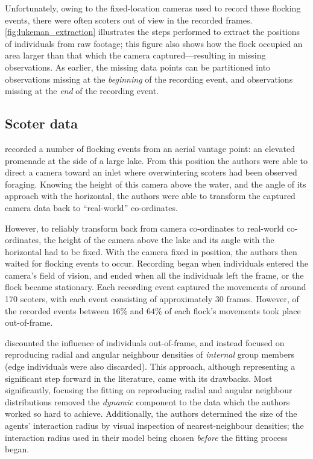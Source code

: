 Unfortunately, owing to the fixed-location cameras used to record these
flocking events, there were often scoters out of view in the recorded frames.
\cref{fig:lukeman_extraction} illustrates the steps performed to extract the
positions of individuals from raw footage; this figure also shows how the flock
occupied an area larger than that which the camera captured---resulting in
missing observations. As earlier, the missing data points can be partitioned
into observations missing at the \emph{beginning} of the recording event, and
observations missing at the \emph{end} of the recording event.

\subsection{Scoter data}

\textcite{lukeman10} recorded a number of flocking events from an aerial
vantage point: an elevated promenade at the side of a large lake. From this
position the authors were able to direct a camera toward an inlet where
overwintering scoters had been observed foraging. Knowing the height of this
camera above the water, and the angle of its approach with the horizontal, the
authors were able to transform the captured camera data back to ``real-world''
co-ordinates.

However, to reliably transform back from camera co-ordinates to real-world
co-ordinates, the height of the camera above the lake and its angle with the
horizontal had to be fixed. With the camera fixed in position, the authors then
waited for flocking events to occur. Recording began when individuals entered
the camera's field of vision, and ended when all the individuals left the
frame, or the flock became stationary. Each recording event captured the
movements of around 170 scoters, with each event consisting of approximately
30 frames. However, of the recorded events between $16\%$ and $64\%$ of each
flock's movements took place out-of-frame.

\textcite{lukeman10} discounted the influence of individuals out-of-frame, and
instead focused on reproducing radial and angular neighbour densities of
\emph{internal} group members (edge individuals were also discarded). This
approach, although representing a significant step forward in the literature,
came with its drawbacks. Most significantly, focusing the fitting on
reproducing radial and angular neighbour distributions removed the
\emph{dynamic} component to the data which the authors worked so hard to
achieve. Additionally, the authors determined the size of the agents'
interaction radius by visual inspection of nearest-neighbour densities; the
interaction radius used in their model being chosen \emph{before} the fitting
process began.

